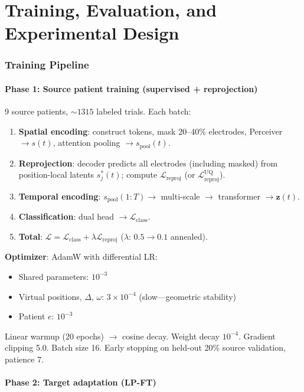 \documentclass[11pt,letterpaper]{article}
\newcommand{\bfz}{\mathbf{z}}
\begin{document}
\part{Training, Evaluation, and Experimental Design}

\section{Training Pipeline}

\subsection{Phase 1: Source patient training (supervised + reprojection)}

9 source patients, ${\sim}1315$ labeled trials. Each batch:
\begin{enumerate}[leftmargin=2em]
\item \textbf{Spatial encoding}: construct tokens, mask 20--40\% electrodes, Perceiver $\to s(t)$, attention pooling $\to s_{\text{pool}}(t)$.
\item \textbf{Reprojection}: decoder predicts all electrodes (including masked) from position-local latents $s_j^*(t)$; compute $\mathcal{L}_{\text{reproj}}$ (or $\mathcal{L}_{\text{reproj}}^{\text{UQ}}$).
\item \textbf{Temporal encoding}: $s_{\text{pool}}(1{:}T) \to$ multi-scale $\to$ transformer $\to \bfz(t)$.
\item \textbf{Classification}: dual head $\to \mathcal{L}_{\text{class}}$.
\item \textbf{Total}: $\mathcal{L} = \mathcal{L}_{\text{class}} + \lambda \mathcal{L}_{\text{reproj}}$ ($\lambda$: $0.5 \to 0.1$ annealed).
\end{enumerate}

\textbf{Optimizer}: AdamW with differential LR:
\begin{itemize}[leftmargin=2em]
\item Shared parameters: $10^{-3}$
\item Virtual positions, $\Delta$, $\omega$: $3 \times 10^{-4}$ (slow---geometric stability)
\item Patient $e$: $10^{-3}$
\end{itemize}

Linear warmup (20 epochs) $\to$ cosine decay. Weight decay $10^{-4}$. Gradient clipping 5.0. Batch size 16. Early stopping on held-out 20\% source validation, patience 7.

\subsection{Phase 2: Target adaptation (LP-FT)}
\end{document}
